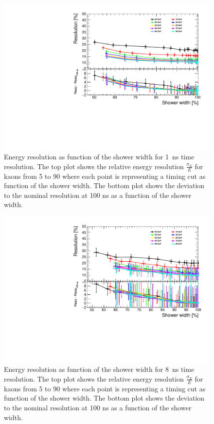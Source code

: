 \begin{figure}[htbp!]
  \centering
  \includegraphics[width=0.7\linewidth]{../Thesis_Plots/ILD/Smearing_1ns/Plots/ShowerWidth_Resolution_Smearing2}
  \caption{Energy resolution as function of the shower width for \SI{1}{\nano\second} time resolution. The top plot shows the relative energy resolution $\frac{\sigma_{E}}{E}$ for kaons from 5 to 90 \GeV where each point is representing a timing cut as function of the shower width. The bottom plot shows the deviation to the nominal resolution at 100 ns as a function of the shower width.} \label{fig:WidthReso1ns}
\end{figure}

\begin{figure}[htbp!]
  \centering
  \includegraphics[width=0.7\linewidth]{../Thesis_Plots/ILD/Smearing_8ns/Plots/ShowerWidth_Resolution_Smearing3}
  \caption{Energy resolution as function of the shower width for \SI{8}{\nano\second} time resolution. The top plot shows the relative energy resolution $\frac{\sigma_{E}}{E}$ for kaons from 5 to 90 \GeV where each point is representing a timing cut as function of the shower width. The bottom plot shows the deviation to the nominal resolution at 100 ns as a function of the shower width.}  \label{fig:WidthReso8ns}
\end{figure}

